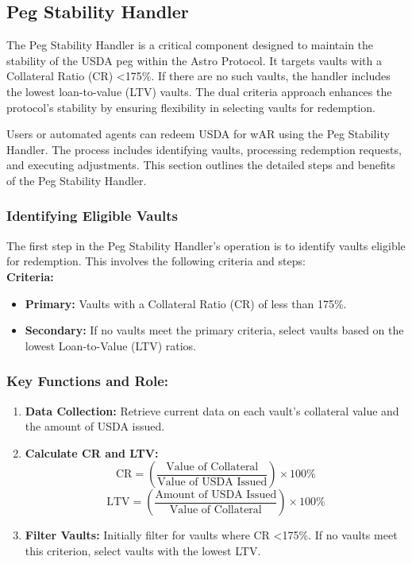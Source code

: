 \subsection{Peg Stability Handler}
The Peg Stability Handler is a critical component designed to maintain the stability of the USDA peg within the Astro Protocol. It targets vaults with a Collateral Ratio (CR) \textless  175\%. If there are no such vaults, the handler includes the lowest loan-to-value (LTV) vaults. The dual criteria approach enhances the protocol's stability by ensuring flexibility in selecting vaults for redemption.

Users or automated agents can redeem USDA for wAR using the Peg Stability Handler. The process includes identifying vaults, processing redemption requests, and executing adjustments. This section outlines the detailed steps and benefits of the Peg Stability Handler.

\subsubsection{Identifying Eligible Vaults}
The first step in the Peg Stability Handler’s operation is to identify vaults eligible for redemption. This involves the following criteria and steps:\\

\textbf{Criteria:}
\begin{itemize}
    \item \textbf{Primary:} Vaults with a Collateral Ratio (CR) of less than 175\%.
    \item \textbf{Secondary:} If no vaults meet the primary criteria, select vaults based on the lowest Loan-to-Value (LTV) ratios.
\end{itemize}

\subsubsection{Key Functions and Role:}
\begin{enumerate}
    \item \textbf{Data Collection:} Retrieve current data on each vault’s collateral value and the amount of USDA issued.

    \item \textbf{Calculate CR and LTV:}
    \[
    \text{CR} = \left( \frac{\text{Value of Collateral}}{\text{Value of USDA Issued}} \right) \times 100\%
    \]
    \[
    \text{LTV} = \left( \frac{\text{Amount of USDA Issued}}{\text{Value of Collateral}} \right) \times 100\%
    \]

    \item \textbf{Filter Vaults:} Initially filter for vaults where CR \textless  175\%. If no vaults meet this criterion, select vaults with the lowest LTV.
\end{enumerate}

